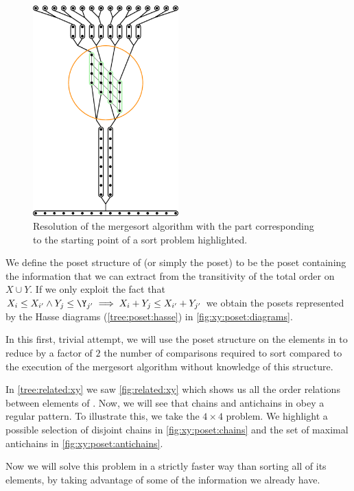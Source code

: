 \begin{figure}
\centering
\includegraphics[width=0.5\textwidth,angle=90]{fig/x+y/poset/mergexy}
\caption{Resolution of the mergesort algorithm with the part
corresponding to the starting point of a sort \XY problem highlighted.}
\label{fig:xy:poset:mergexy}
\end{figure}

We define the poset structure of \XY (or simply the \XY poset) to be the poset
containing the information that we can extract from the transitivity of the
total order on \(X \cup Y\). If we only exploit the fact that
\(X_i \le X_{i'} \land Y_j \le \Y_{j'} \implies X_i + Y_j \le X_{i'} + Y_{j'}\)
we obtain the posets represented by the Hasse diagrams (\ref{tree:poset:hasse})
in \ref{fig:xy:poset:diagrams}.

In this first, trivial attempt, we will use the poset structure on the elements
in \XY to reduce by a factor of $2$ the number of comparisons
required to sort \XY compared to the execution of the mergesort algorithm
without knowledge of this structure.

In \ref{tree:related:xy} we saw \ref{fig:related:xy} which shows us all the order
relations between elements of \XY. Now, we will see that chains and antichains
in \XY obey a regular pattern. To illustrate this, we take the $4 \times 4$
\XY problem. We highlight a possible selection of disjoint chains in
\ref{fig:xy:poset:chains} and the set of maximal antichains in
\ref{fig:xy:poset:antichains}.

Now we will solve this problem in a strictly faster way than sorting all
of its elements, by taking advantage of some of the information we already have.

